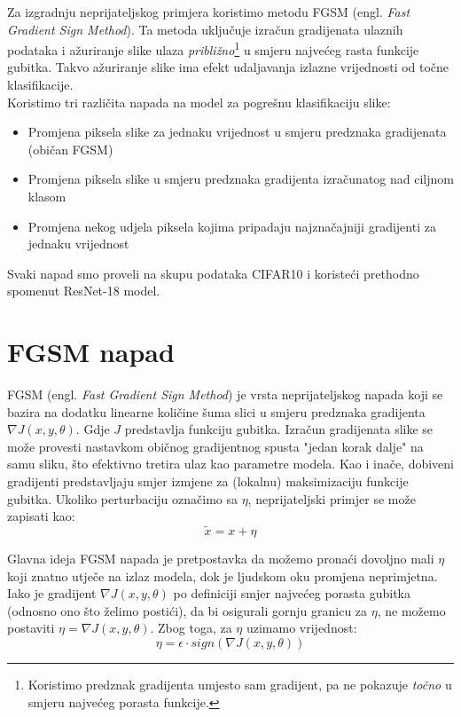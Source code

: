 Za izgradnju neprijateljskog primjera koristimo metodu FGSM (engl. \textit{Fast Gradient Sign Method}). Ta metoda uključuje izračun gradijenata ulaznih podataka i ažuriranje slike ulaza \textit{približno}\footnote{Koristimo predznak gradijenta umjesto sam gradijent, pa ne pokazuje \textit{točno} u smjeru najvećeg porasta funkcije.} u smjeru najvećeg rasta funkcije gubitka. Takvo ažuriranje slike ima efekt udaljavanja izlazne vrijednosti od točne klasifikacije. \\

Koristimo tri različita napada na model za pogrešnu klasifikaciju slike: 
\begin{itemize}
	\setlength\itemsep{-0.25em}
    \item Promjena piksela slike za jednaku vrijednost u smjeru predznaka gradijenata (običan FGSM)
    \item Promjena piksela slike u smjeru predznaka gradijenta izračunatog nad ciljnom klasom
    \item Promjena nekog udjela piksela kojima pripadaju najznačajniji gradijenti za jednaku vrijednost
\end{itemize}

Svaki napad smo proveli na skupu podataka CIFAR10 i koristeći prethodno spomenut ResNet-18 model.

\section{FGSM napad}

FGSM (engl. \textit{Fast Gradient Sign Method}) je vrsta neprijateljskog napada koji se bazira na dodatku linearne količine šuma slici u smjeru predznaka gradijenta $\nabla J(x, y, \theta)$. Gdje $J$ predstavlja funkciju gubitka. Izračun gradijenata slike se može provesti nastavkom običnog gradijentnog spusta "jedan korak dalje" na samu sliku, što efektivno tretira ulaz kao parametre modela. Kao i inače, dobiveni gradijenti predstavljaju smjer izmjene za (lokalnu) maksimizaciju funkcije gubitka. Ukoliko perturbaciju označimo sa $\eta$, neprijateljski primjer se može zapisati kao: 
\[\widetilde{x} = x + \eta\]

Glavna ideja FGSM napada je pretpostavka da možemo pronaći dovoljno mali $\eta$ koji znatno utječe na izlaz modela, dok je ljudskom oku promjena neprimjetna. Iako je gradijent $\nabla J(x, y, \theta)$ po definiciji smjer najvećeg porasta gubitka (odnosno ono što želimo postići), da bi osigurali gornju granicu za $\eta$, ne možemo postaviti $\eta = \nabla J(x, y, \theta)$. Zbog toga, za $\eta$ uzimamo vrijednost: 
\[\eta = \epsilon \cdot sign\left(\nabla J(x, y, \theta)\right)\]


